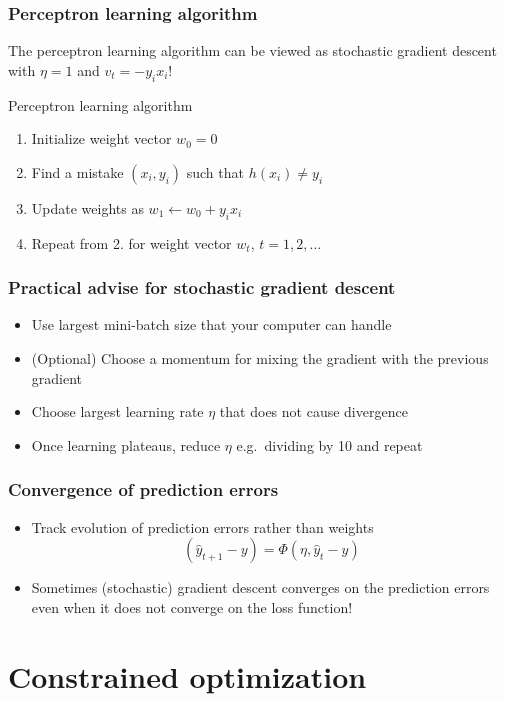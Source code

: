 \documentclass[10pt]{beamer}
\begin{document}
\begin{frame}
  \frametitle{Perceptron learning algorithm}
  The perceptron learning algorithm can be viewed as stochastic gradient descent with $\eta=1$ and $v_t=-y_ix_i$!
  \begin{block}{Perceptron learning algorithm}
  \begin{enumerate}
	\item Initialize weight vector $w_0=0$
	\item Find a {\color{red} mistake} $(x_i,y_i)$ such that $h(x_i)\neq y_i$
	\item Update weights as $w_1\leftarrow w_0+y_ix_i$
	\item Repeat from 2. for weight vector $w_t$, $t=1,2,\ldots$
  \end{enumerate}
  \end{block}
\end{frame}

\begin{frame}
  \frametitle{Practical advise for stochastic gradient descent}
  \begin{itemize}
	\item Use largest mini-batch size that your computer can handle
	\item (Optional) Choose a momentum for mixing the gradient with the previous gradient
	\item Choose largest learning rate $\eta$ that does not cause divergence
	\item Once learning plateaus, reduce $\eta$ e.g.~dividing by 10 and repeat
  \end{itemize}
\end{frame}

\begin{frame}
  \frametitle{Convergence of prediction errors}
  \begin{itemize}
	\item Track evolution of {\color{red} prediction errors} rather than weights
	\[
	(\hat{y}_{t+1}-y) = \Phi(\eta, \hat{y}_t - y)
	\]
	\item Sometimes (stochastic) gradient descent converges on the prediction errors even when it does not converge on the loss function!
  \end{itemize}
\end{frame}

\section{Constrained optimization}
\end{document}
